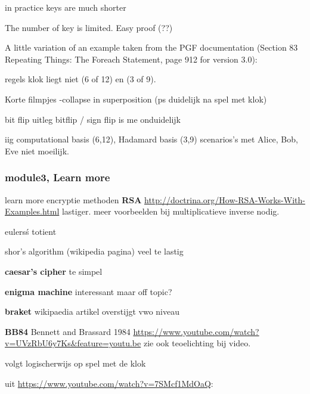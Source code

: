 \documentclass[../../main.tex]{subfiles}
\begin{document}
in practice keys are much shorter

The number of key is limited. Easy proof (??)

A little variation of an example taken from the PGF documentation (Section 83 Repeating Things: The Foreach Statement, page 912 for version 3.0):

 
regels klok liegt niet (6 of 12) en (3 of 9).

Korte filmpjes 
-collapse in superposition (ps duidelijk na spel met klok) 

bit flip uitleg bitflip / sign flip is me onduidelijk

iig computational basis (6,12), Hadamard basis (3,9)
scenarios's met Alice, Bob, Eve
niet moeilijk.

\subsubsection*{module3, Learn more}

learn more encryptie methoden 
\textbf{RSA} \url{http://doctrina.org/How-RSA-Works-With-Examples.html} lastiger. 
meer voorbeelden bij multiplicatieve inverse nodig.

eulers\'s totient

shor's algorithm (wikipedia pagina) veel te lastig

\textbf{caesar's cipher} te simpel

\textbf{enigma machine} interessant maar off topic?

\textbf{braket} wikipaedia artikel overstijgt vwo niveau

\textbf{BB84} Bennett and Brassard 1984 \url{https://www.youtube.com/watch?v=UVzRbU6y7Ks&feature=youtu.be} zie ook teoelichting bij video.

volgt logischerwijs op spel met de klok

uit \url{https://www.youtube.com/watch?v=7SMcf1MdOaQ}:
\end{document}
